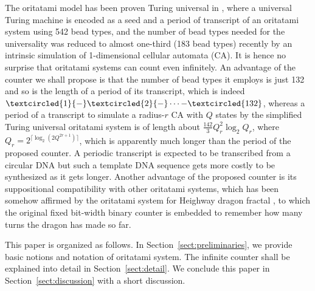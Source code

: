 \documentclass[twocolumn]{svjour3}
\begin{document}
The oritatami model has been proven Turing universal in \cite{GeMeScSe2018}, where a universal Turing machine is encoded as a seed and a period of transcript of an oritatami system using 542 bead types, and the number of bead types needed for the universality was reduced to almost one-third (183 bead types) recently \cite{PchelinaSSU2020} by an intrinsic simulation of 1-dimensional cellular automata (CA). 
It is hence no surprise that oritatami systems can count even infinitely. 
An advantage of the counter we shall propose is that the number of bead types it employs is just 132 and so is the length of a period of its transcript, which is indeed $\textcircled{\scriptsize 1}{-}\textcircled{\scriptsize 2}{-} \cdots {-}\textcircled{\tiny 132}$, whereas a period of a transcript to simulate a radius-$r$ CA with $Q$ states by the simplified Turing universal oritatami system is of length about $\frac{142}{3}Q_r^2 \log_2 Q_r$, where $Q_r = 2^{\lceil \log_2(2Q^{2r+1})\rceil}$, which is apparently much longer than the period of the proposed counter. 
A periodic transcript is expected to be transcribed from a circular DNA \cite{GearyAndersen2014} but such a template DNA sequence gets more costly to be synthesized as it gets longer. 
Another advantage of the proposed counter is its suppositional compatibility with other oritatami systems, which has been somehow affirmed by the oritatami system for Heighway dragon fractal \cite{MasudaSekiUbukata2018}, to which the original fixed bit-width binary counter is embedded to remember how many turns the dragon has made so far. 

This paper is organized as follows. 
In Section~\ref{sect:preliminaries}, we provide basic notions and notation of oritatami system. 
The infinite counter shall be explained into detail in Section~\ref{sect:detail}. 
We conclude this paper in Section~\ref{sect:discussion} with a short discussion. 
\end{document}
